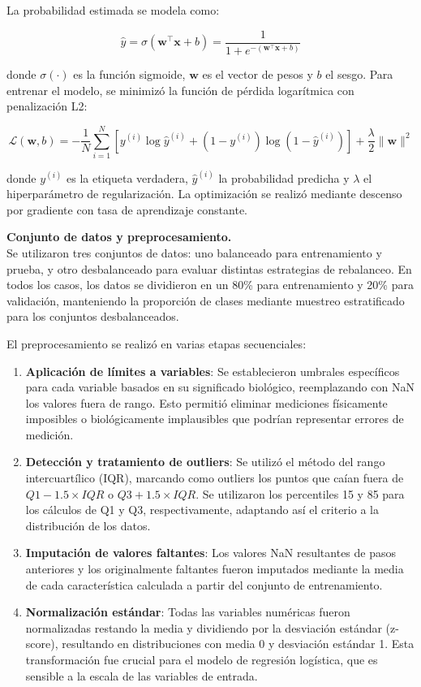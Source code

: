 La probabilidad estimada se modela como:

\[
\hat{y} = \sigma(\mathbf{w}^\top \mathbf{x} + b) = \frac{1}{1 + e^{-(\mathbf{w}^\top \mathbf{x} + b)}}
\]

donde $\sigma(\cdot)$ es la función sigmoide, $\mathbf{w}$ es el vector de pesos y $b$ el sesgo. Para entrenar el modelo, se minimizó la función de pérdida logarítmica con penalización L2:

\[
\mathcal{L}(\mathbf{w}, b) = -\frac{1}{N} \sum_{i=1}^N \left[ y^{(i)} \log \hat{y}^{(i)} + (1 - y^{(i)}) \log (1 - \hat{y}^{(i)}) \right] + \frac{\lambda}{2} \|\mathbf{w}\|^2
\]

donde $y^{(i)}$ es la etiqueta verdadera, $\hat{y}^{(i)}$ la probabilidad predicha y $\lambda$ el hiperparámetro de regularización. La optimización se realizó mediante descenso por gradiente con tasa de aprendizaje constante.

\vspace{0.3cm}
\noindent \textbf{Conjunto de datos y preprocesamiento.} \\
Se utilizaron tres conjuntos de datos: uno balanceado para entrenamiento y prueba, y otro desbalanceado para evaluar distintas estrategias de rebalanceo. En todos los casos, los datos se dividieron en un 80\% para entrenamiento y 20\% para validación, manteniendo la proporción de clases mediante muestreo estratificado para los conjuntos desbalanceados. 

El preprocesamiento se realizó en varias etapas secuenciales:

\begin{enumerate}
    \item \textbf{Aplicación de límites a variables}: Se establecieron umbrales específicos para cada variable basados en su significado biológico, reemplazando con NaN los valores fuera de rango. Esto permitió eliminar mediciones físicamente imposibles o biológicamente implausibles que podrían representar errores de medición.
    
    \item \textbf{Detección y tratamiento de outliers}: Se utilizó el método del rango intercuartílico (IQR), marcando como outliers los puntos que caían fuera de $Q1 - 1.5 \times IQR$ o $Q3 + 1.5 \times IQR$. Se utilizaron los percentiles 15 y 85 para los cálculos de Q1 y Q3, respectivamente, adaptando así el criterio a la distribución de los datos.
    
    \item \textbf{Imputación de valores faltantes}: Los valores NaN resultantes de pasos anteriores y los originalmente faltantes fueron imputados mediante la media de cada característica calculada a partir del conjunto de entrenamiento. 
    
    \item \textbf{Normalización estándar}: Todas las variables numéricas fueron normalizadas restando la media y dividiendo por la desviación estándar (z-score), resultando en distribuciones con media 0 y desviación estándar 1. Esta transformación fue crucial para el modelo de regresión logística, que es sensible a la escala de las variables de entrada.
\end{enumerate}


